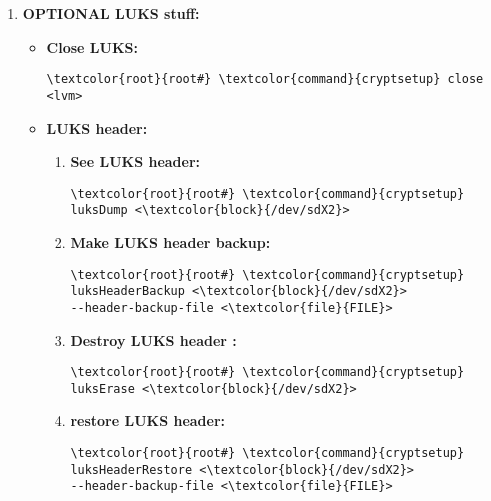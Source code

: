 \documentclass[10pt, a4paper, onecolumn, openany]{book} %
\begin{document}
\begin{enumerate}
    \item \textbf{OPTIONAL LUKS stuff:}
    \begin{itemize}
        \item \textbf{Close LUKS:}
\begin{Verbatim}[commandchars=\\\{\}]
\textcolor{root}{root#} \textcolor{command}{cryptsetup} close <lvm>
\end{Verbatim}
\item \textbf{LUKS header:}
        \begin{enumerate}
            \item \textbf{See LUKS header:}
\begin{Verbatim}[commandchars=\\\{\}]
\textcolor{root}{root#} \textcolor{command}{cryptsetup} luksDump <\textcolor{block}{/dev/sdX2}>
\end{Verbatim}
            \item \textbf{Make LUKS header backup:}
\begin{Verbatim}[commandchars=\\\{\}]
\textcolor{root}{root#} \textcolor{command}{cryptsetup} luksHeaderBackup <\textcolor{block}{/dev/sdX2}> 
--header-backup-file <\textcolor{file}{FILE}>
\end{Verbatim}
            \item \textbf{Destroy LUKS header :}
\begin{Verbatim}[commandchars=\\\{\}]
\textcolor{root}{root#} \textcolor{command}{cryptsetup} luksErase <\textcolor{block}{/dev/sdX2}>
\end{Verbatim}
            \item \textbf{restore LUKS header:}
\begin{Verbatim}[commandchars=\\\{\}]
\textcolor{root}{root#} \textcolor{command}{cryptsetup} luksHeaderRestore <\textcolor{block}{/dev/sdX2}> 
--header-backup-file <\textcolor{file}{FILE}>
\end{Verbatim}
        \end{enumerate}
    \end{itemize}


\end{enumerate}
\end{document}

